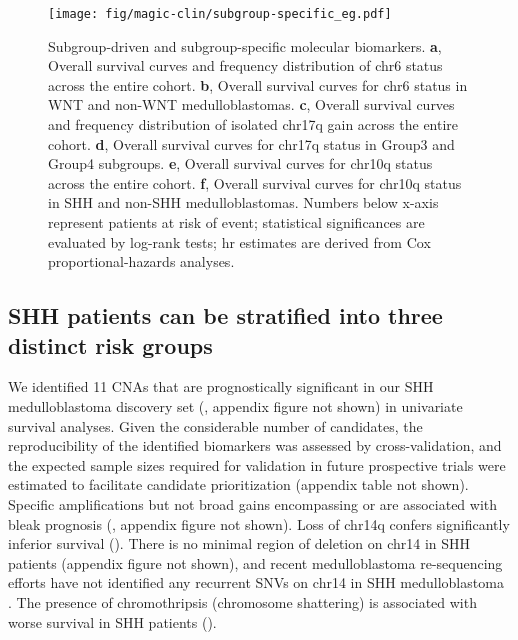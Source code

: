 \clearpage

\begin{figure}[h]
	\begin{center}
		\texttt{[image: fig/magic-clin/subgroup-specific\_eg.pdf]}
	\end{center}
	\caption[Subgroup-driven and subgroup-specific molecular biomarkers]
	{
	Subgroup-driven and subgroup-specific molecular biomarkers.
	\textbf{a}, Overall survival curves and frequency distribution of chr6 status across the entire cohort.
	\textbf{b}, Overall survival curves for chr6 status in WNT and non-WNT medulloblastomas.		
	\textbf{c}, Overall survival curves and frequency distribution of isolated chr17q gain across the entire cohort.
	\textbf{d}, Overall survival curves for chr17q status in Group3 and Group4 subgroups. 
	\textbf{e}, Overall survival curves for chr10q status across the entire cohort.
	\textbf{f}, Overall survival curves for chr10q status in SHH and non-SHH medulloblastomas.
	Numbers below x-axis represent patients at risk of event; statistical significances are evaluated by log-rank tests; \gls{hr} estimates are derived from Cox proportional-hazards analyses.
	}
	\label{fig:subgroup-specific_eg}
\end{figure}

\clearpage

\subsection{SHH patients can be stratified into three distinct risk groups}

We identified 11 CNAs that are prognostically significant in our SHH medulloblastoma discovery set (, appendix figure not shown) in univariate survival analyses. Given the considerable number of candidates, the reproducibility of the identified biomarkers was assessed by cross-validation, and the expected sample sizes required for validation in future prospective trials were estimated to facilitate candidate prioritization (appendix table not shown). Specific amplifications but not broad gains encompassing  or  are associated with bleak prognosis (, appendix figure not shown). Loss of chr14q confers significantly inferior survival (). There is no minimal region of deletion on chr14 in SHH patients (appendix figure not shown), and recent medulloblastoma re-sequencing efforts have not identified any recurrent SNVs on chr14 in SHH medulloblastoma . The presence of chromothripsis (chromosome shattering) is associated with worse survival in SHH patients ().

